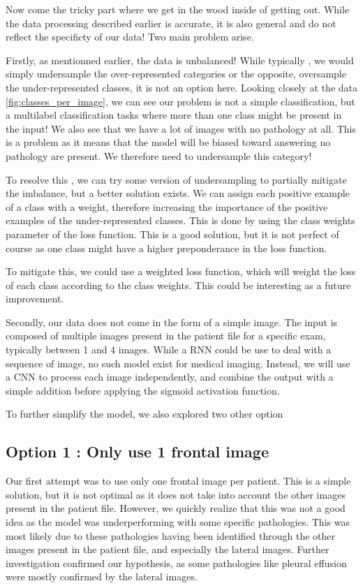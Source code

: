 \documentclass[11pt]{article}
\begin{document}
    Now come the tricky part where we get in the wood inside of getting out. While the data processing described earlier
    is accurate, it is also general and do not reflect the specificty of our data! Two main problem arise.

    Firstly, as mentionned earlier, the data is unbalanced! While typically , we would simply undersample the over-represented
    categories or the opposite, oversample the under-represented classes, it is not an option here. Looking closely at the data \ref{fig:classes_per_image},
    we can see our problem is not a simple classification, but a multilabel classification tasks where more than one class might be present
    in the input! We also see that we have a lot of images with no pathology at all. This is a problem as it means that the model will be biased toward answering no pathology are present. We therefore need to undersample this category!



    To resolve this , we can try some version of undersampling to partially mitigate the imbalance, but a better solution exists. We can assign each positive example
    of a class with a weight, therefore increasing the importance of the positive examples of the under-represented classes. This is
    done by using the class weights parameter of the loss function. This is a good solution, but it is not perfect of course as one class might have a higher preponderance in the loss
    function.

    To mitigate this, we could use a weighted loss function, which will weight the loss of each class according to the class weights. This could be interesting as a future improvement.


    Secondly, our data does not come in the form of a simple image. The input is composed of multiple images present in the patient file for a specific exam, typically between 1 and 4 images. While a RNN could be use to deal
    with a sequence of image, no such model exist for medical imaging. Instead, we will use a CNN to process each image independently, and combine the output with a simple addition before applying the sigmoid activation function.

    To further simplify the model, we also explored two other option

    \subsection{Option 1 : Only use 1 frontal image}
        Our first attempt was to use only one frontal image per patient. This is a simple solution, but it is not optimal as it does not take into account the other images present in the patient file.
        However, we quickly realize that this was not a good idea as the model was underperforming with some specific pathologies. This was most
        likely due to these pathologies having been identified through the other images present in the patient file, and especially the lateral images.
        Further investigation confirmed our hypothesis, as some pathologies like pleural effusion were mostly confirmed by the lateral images.
\end{document}
